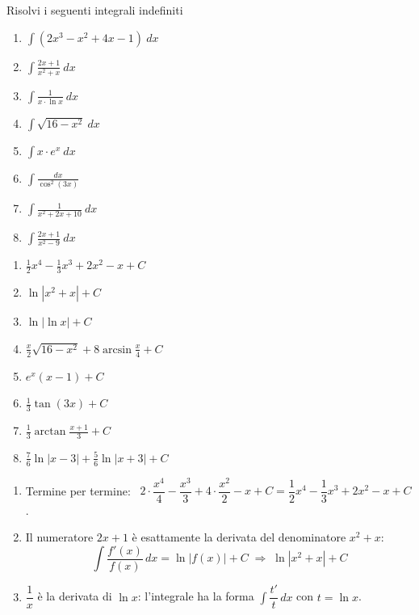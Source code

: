 \begin{question}[ID=1.2, subtitle={Integrali indefiniti — serie 2}, tags={integrali, indefiniti}, difficulty=media]
Risolvi i seguenti integrali indefiniti

\begin{center}\begin{minipage}{0.7\linewidth}
\begin{enumerate}
\item $\int (2x^3 - x^2 + 4x -1) \ dx$
\item $\int \frac{2x+1}{x^2+x} \ dx$
\item $\int \frac{1}{x \cdot \ln x} \ dx$
\item $\int \sqrt{16- x^2} \ dx$
\item $\int x \cdot e^{x} \ dx$
\item $\int \frac{dx}{\cos^2(3x)}$
\item $\int \frac{1}{x^2 + 2x + 10} \ dx$
\item $\int \frac{2x+1}{x^2-9} \ dx$
\end{enumerate}
\end{minipage}\end{center}
\begin{solution}
\begin{enumerate}
    \item $\tfrac12x^4-\tfrac13x^3+2x^2-x+C$
    \item $\ln|x^2+x|+C$
    \item $\ln|\ln x|+C$
    \item $\tfrac x2\sqrt{16-x^2}+8\arcsin\tfrac x4+C$
    \item $e^x(x-1)+C$
    \item $\tfrac13\tan(3x)+C$
    \item $\tfrac13\arctan\tfrac{x+1}{3}+C$
    \item $\tfrac76\ln|x-3|+\tfrac56\ln|x+3|+C$
\end{enumerate}
\end{solution}
\begin{explanation}
\begin{enumerate}
    \item Termine per termine: \ $2\cdot\dfrac{x^4}{4}-\dfrac{x^3}{3}+4\cdot\dfrac{x^2}{2}-x+C=\dfrac12x^4-\dfrac13x^3+2x^2-x+C$.
    \item Il numeratore $2x+1$ è esattamente la derivata del denominatore $x^2+x$:
    \[ \int\dfrac{f'(x)}{f(x)}\,dx=\ln|f(x)|+C \;\Rightarrow\; \ln|x^2+x|+C \]
    \item $\dfrac1x$ è la derivata di $\ln x$: l'integrale ha la forma $\int\dfrac{t'}{t}\,dx$ con $t=\ln x$.

\end{enumerate}
\end{explanation}
\end{question}
